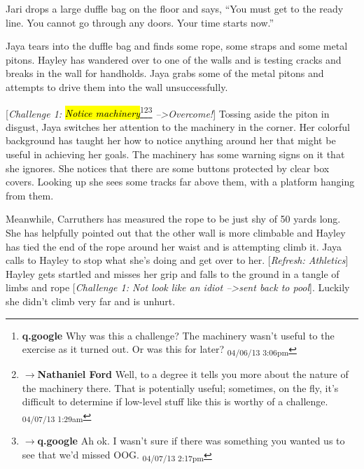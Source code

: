 Jari drops a large duffle bag on the floor and says, ``You must get to the ready line.  You cannot go through any doors.  Your time starts now.''



Jaya tears into the duffle bag and finds some rope, some straps and some metal pitons.  Hayley has wandered over to one of the walls and is testing cracks and breaks in the wall for handholds.  Jaya grabs some of the metal pitons and attempts to drive them into the wall unsuccessfully.



{[}\textit{Challenge 1: }\textit{\hl{Notice machinery}}\footnote{\textbf{q.google }Why was this a challenge?  The machinery wasn't useful to the exercise as it turned out.  Or was this for later? \textsubscript{04/06/13 3:06pm}}\footnote{$\rightarrow$\textbf{Nathaniel Ford }Well, to a degree it tells you more about the nature of the machinery there. That is potentially useful; sometimes, on the fly, it's difficult to determine if low-level stuff like this is worthy of a challenge. \textsubscript{04/07/13 1:29am}}\footnote{$\rightarrow$\textbf{q.google }Ah ok.  I wasn't sure if there was something you wanted us to see that we'd missed OOG. \textsubscript{04/07/13 2:17pm}}\textit{ --\textgreater  Overcome!}{]} Tossing aside the piton in disgust, Jaya switches her attention to the machinery in the corner.  Her colorful background has taught her how to notice anything around her that might be useful in achieving her goals.  The machinery has some warning signs on it that she ignores.  She notices that there are some buttons protected by clear box covers.  Looking up she sees some tracks far above them, with a platform hanging from them.



Meanwhile, Carruthers has measured the rope to be just shy of 50 yards long. She has helpfully pointed out that the other wall is more climbable and Hayley has tied the end of the rope around her waist and is attempting climb it.  Jaya calls to Hayley to stop what she's doing and get over to her.   {[}\textit{Refresh: Athletics}{]} Hayley gets startled and misses her grip and falls to the ground in a tangle of limbs and rope {[}\textit{Challenge 1: Not look like an idiot --\textgreater  sent back to pool}{]}. Luckily she didn't climb very far and is unhurt.  



